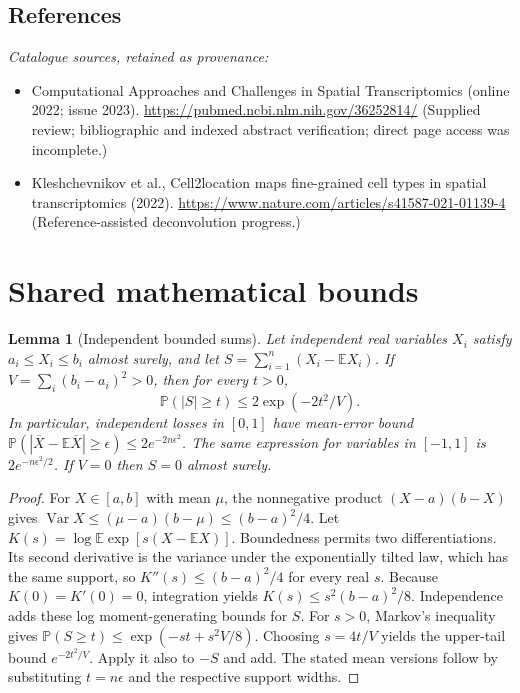 \documentclass[11pt]{article}
\newcommand{\E}{\mathbb E}
\newcommand{\Prob}{\mathbb P}
\DeclareMathOperator{\Var}{Var}
\providecommand{\E}{\mathbb E}
\providecommand{\Prob}{\mathbb P}
\providecommand{\Var}{\operatorname{Var}}
\newtheorem{sharedlemma}{Lemma}[section]
\begin{document}
\subsection{References}
\noindent\emph{Catalogue sources, retained as provenance:}
\begin{itemize}
\item Computational Approaches and Challenges in Spatial Transcriptomics (online 2022; issue 2023). \url{https://pubmed.ncbi.nlm.nih.gov/36252814/} (Supplied review; bibliographic and indexed abstract verification; direct page access was incomplete.)
\item Kleshchevnikov et al., Cell2location maps fine-grained cell types in spatial transcriptomics (2022). \url{https://www.nature.com/articles/s41587-021-01139-4} (Reference-assisted deconvolution progress.)
\end{itemize}
\clearpage


\appendix
\section{Shared mathematical bounds}\label{app:bounds}
\begin{sharedlemma}[Independent bounded sums]\label{lem:bounded}
Let independent real variables $X_i$ satisfy $a_i\leq X_i\leq b_i$ almost surely,
and let $S=\sum_{i=1}^n(X_i-\E X_i)$. If
$V=\sum_i(b_i-a_i)^2>0$, then for every $t>0$,
\[
 \Prob(|S|\geq t)\leq 2\exp(-2t^2/V).
\]
In particular, independent losses in $[0,1]$ have mean-error bound
$\Prob(|\overline X-\E\overline X|\geq\epsilon)
\leq2e^{-2n\epsilon^2}$. The same expression for variables in $[-1,1]$
is $2e^{-n\epsilon^2/2}$. If $V=0$ then $S=0$ almost surely.
\end{sharedlemma}
\begin{proof}
For $X\in[a,b]$ with mean $\mu$, the nonnegative product
$(X-a)(b-X)$ gives
$\Var X\leq(\mu-a)(b-\mu)\leq(b-a)^2/4$.
Let $K(s)=\log\E\exp[s(X-\E X)]$.
Boundedness permits two differentiations. Its second derivative is the variance
under the exponentially tilted law, which has the same support, so
$K''(s)\leq(b-a)^2/4$ for every real $s$.
Because $K(0)=K'(0)=0$, integration yields
$K(s)\leq s^2(b-a)^2/8$.
Independence adds these log moment-generating bounds for $S$.
For $s>0$, Markov's inequality gives
$\Prob(S\geq t)\leq\exp(-st+s^2V/8)$.
Choosing $s=4t/V$ yields the upper-tail bound $e^{-2t^2/V}$.
Apply it also to $-S$ and add. The stated mean versions follow by substituting
$t=n\epsilon$ and the respective support widths.
\end{proof}
\end{document}
